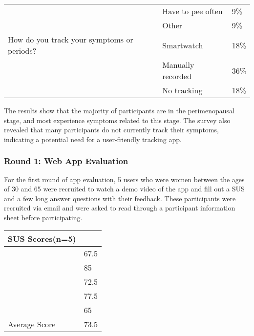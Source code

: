 \begin{table}[h!!]
{\begin{tabular}{lll}
                                                                                        & Have to pee often      & 9\%  \\
                                                                                        & Other                  & 9\%  \\
        How do you track your symptoms or periods?                                      & Smartwatch             & 18\% \\
                                                                                        & Manually recorded      & 36\% \\
                                                                                        & No tracking            & 18\% \\ \hline
        \end{tabular}
    }
  \end{table}

The results show that the majority of participants are in the perimenopausal stage, and most experience symptoms related to this stage. The survey also revealed that many participants do not currently track their symptoms, indicating a potential need for a user-friendly tracking app.

\subsubsection{Round 1: Web App Evaluation}
For the first round of app evaluation, 5 users who were women between the ages of 30 and 65 were recruited to watch a demo video of the app and fill out a SUS and a few long answer questions with their feedback. These participants were recruited via email and were asked to read through a participant information sheet before participating.

\begin{table}[h!!]
    \begin{tabular}{ll}
    \hline
    SUS Scores(n=5) &      \\ \hline
                    & 67.5 \\
                    & 85   \\
                    & 72.5 \\
                    & 77.5 \\
                    & 65   \\
        Average Score & 73.5
    \end{tabular}
    \end{table}


